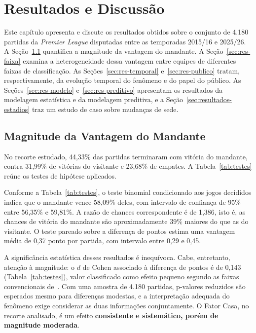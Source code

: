 
\chapter{Resultados e Discussão}\label{cap:resultados}

Este capítulo apresenta e discute os resultados obtidos sobre o conjunto de
4.180 partidas da \textit{Premier League} disputadas entre as temporadas
2015/16 e 2025/26. A Seção~\ref{sec:res-magnitude} quantifica a magnitude da
vantagem do mandante. A Seção~\ref{sec:res-faixa} examina a heterogeneidade
dessa vantagem entre equipes de diferentes faixas de classificação. As
Seções~\ref{sec:res-temporal} e~\ref{sec:res-publico} tratam, respectivamente,
da evolução temporal do fenômeno e do papel do público. As
Seções~\ref{sec:res-modelo} e~\ref{sec:res-preditivo} apresentam os resultados
da modelagem estatística e da modelagem preditiva, e a
Seção~\ref{sec:resultados-estadios} traz um estudo de caso sobre mudanças de
sede.

\section{Magnitude da Vantagem do Mandante}\label{sec:res-magnitude}

No recorte estudado, 44,33\% das partidas terminaram com vitória do mandante,
contra 31,99\% de vitórias do visitante e 23,68\% de empates. A
Tabela~\ref{tab:testes} reúne os testes de hipótese aplicados.

\begin{table}[htb]
  \centering
  \caption{Testes de hipótese sobre a vantagem do mandante.}
  \label{tab:testes}
  \resizebox{\textwidth}{!}{}
\end{table}

Conforme a Tabela~\ref{tab:testes}, o teste binomial condicionado aos jogos
decididos indica que o mandante vence 58,09\% deles, com intervalo de confiança de 95\% entre 56,35\% e 59,81\%. A
razão de chances correspondente é de 1,386, isto é, as chances de vitória do
mandante são aproximadamente 39\% maiores do que as do visitante. O teste
pareado sobre a diferença de pontos estima uma vantagem média de 0,37 ponto por
partida, com intervalo entre 0,29 e 0,45.

A significância estatística desses resultados é inequívoca. Cabe, entretanto,
atenção à magnitude: o $d$ de Cohen associado à diferença de pontos é de 0,143
(Tabela~\ref{tab:testes}), valor classificado como efeito pequeno segundo as faixas convencionais
de~. Com uma amostra de 4.180 partidas, p-valores
reduzidos são esperados mesmo para diferenças modestas, e a interpretação
adequada do fenômeno exige considerar as duas informações conjuntamente. O Fator
Casa, no recorte analisado, é um efeito \textbf{consistente e sistemático, porém
de magnitude moderada}.

